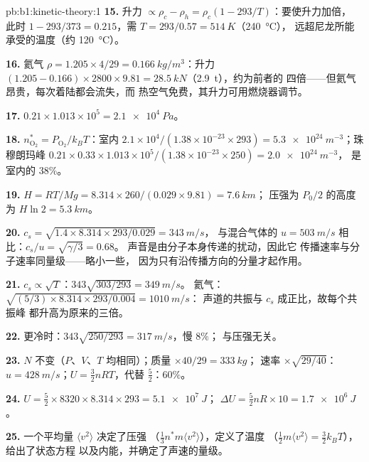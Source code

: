 \begin{solution}{pb:b1:kinetic-theory:1}
\textbf{15.} 升力 $\propto \rho_c - \rho_h = \rho_c(1 - 293/T)$：要使升力加倍，
此时 $1 - 293/373 = 0.215$，需 $T = 293/0.57 = \qty{514}{K}$（\qty{240}{\degreeCelsius}），
远超尼龙所能承受的温度（约 \qty{120}{\degreeCelsius}）。

\textbf{16.} 氦气 $\rho = 1.205 \times 4/29 = \qty{0.166}{kg/m^3}$：升力
$(1.205 - 0.166) \times 2800 \times 9.81 = \qty{28.5}{kN}$（\qty{2.9}{t}），约为前者的
四倍——但氦气昂贵，每次着陆都会流失，而
热空气免费，其升力可用燃烧器调节。

\textbf{17.} $0.21 \times 1.013\times10^5 = \qty{2.1e4}{Pa}$。

\textbf{18.} $n^*_{\mathrm{O}_2} = P_{\mathrm{O}_2}/k_BT$：室内 $2.1\times10^4/
(1.38\times10^{-23} \times 293) = \qty{5.3e24}{m^{-3}}$；珠穆朗玛峰 $0.21 \times 0.33
\times 1.013\times10^5/(1.38\times10^{-23} \times 250) = \qty{2.0e24}{m^{-3}}$，
是室内的 $38\%$。

\textbf{19.} $H = RT/Mg = 8.314 \times 260/(0.029 \times 9.81) = \qty{7.6}{km}$；
压强为 $P_0/2$ 的高度为 $H\ln 2 = \qty{5.3}{km}$。

\textbf{20.} $c_s = \sqrt{1.4 \times 8.314 \times 293/0.029} = \qty{343}{m/s}$，
与混合气体的 $u = \qty{503}{m/s}$ 相比：$c_s/u = \sqrt{\gamma/3} = 0.68$。
声音是由分子本身传递的扰动，因此它
传播速率与分子速率同量级——略小一些，
因为只有沿传播方向的分量才起作用。

\textbf{21.} $c_s \propto \sqrt T$：$343\sqrt{303/293} = \qty{349}{m/s}$。
氦气：$\sqrt{(5/3) \times 8.314 \times 293/0.004} = \qty{1010}{m/s}$：
声道的共振与 $c_s$ 成正比，故每个共振峰
都升高为原来的三倍。

\textbf{22.} 更冷时：$343\sqrt{250/293} = \qty{317}{m/s}$，慢 $8\%$；
与压强无关。

\textbf{23.} $N$ 不变（$P$、$V$、$T$ 均相同）；质量 $\times 40/29 = \qty{333}{kg}$；
速率 $\times\sqrt{29/40}$：$u = \qty{428}{m/s}$；$U = \tfrac32 nRT$，代替
$\tfrac52$：$60\%$。

\textbf{24.} $U = \tfrac52 \times 8320 \times 8.314 \times 293 = \qty{5.1e7}{J}$；
$\Delta U = \tfrac52 nR \times 10 = \qty{1.7e6}{J}$。

\textbf{25.} 一个平均量 $\langle v^2\rangle$ 决定了压强
（$\tfrac13 n^*m\langle v^2\rangle$），定义了温度
（$\tfrac12 m\langle v^2\rangle = \tfrac32 k_BT$），给出了状态方程
以及内能，并确定了声速的量级。
\end{solution}
